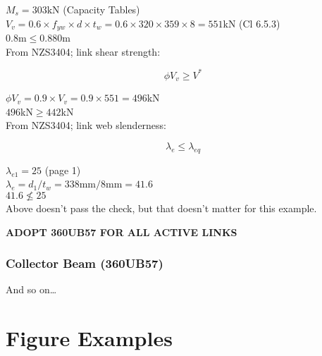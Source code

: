 \documentclass[12pt,a4paper]{article} %
\newcommand{\tab}{\hspace*{2em}} %
\begin{document}
\tab $M_s=303\mathrm{kN}$ (Capacity Tables) \\[8pt]
\tab $V_v=0.6 \times f_{yw} \times d \times t_w = 0.6 \times 320 \times 359 \times 8 = 551$kN (Cl 6.5.3) \\[8pt]
\tab $0.8$m$\leqslant0.880$m  \\

From NZS3404; link shear strength:

\begin{equation*}
\tag{Cl 6.5.3}
\phi V_v \geqslant V^*
\end{equation*}

\tab $\phi V_v=0.9\times V_v=0.9\times551=496$kN \\[8pt]
\tab $496$kN$\geqslant442$kN  \\

From NZS3404; link web slenderness:

\begin{equation*}
\tag{Cl 12.8.3}
\lambda_e \leqslant \lambda_{eq}
\end{equation*}

\tab $\lambda_{e1}=25$ (page 1) \\[8pt]
\tab $\lambda_e=d_1/t_w=338$mm$/8$mm$=41.6$ \\[8pt]
\tab $41.6 \nleqslant 25$  \\

Above doesn't pass the check, but that doesn't matter for this example.
\par\vspace{\baselineskip}

\begin{center}
\textbf{ADOPT 360UB57 FOR ALL ACTIVE LINKS} \\
\end{center}

\subsubsection{Collector Beam (360UB57)}
And so on\dots


\section{Figure Examples}
\end{document}
